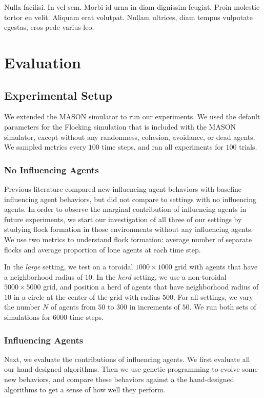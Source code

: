 \begin{savequote}[75mm]
Nulla facilisi. In vel sem. Morbi id urna in diam dignissim feugiat. Proin molestie tortor eu velit. Aliquam erat volutpat. Nullam ultrices, diam tempus vulputate egestas, eros pede varius leo.
\end{savequote}

\chapter{Evaluation}
\label{ch:evaluation}

\section{Experimental Setup}

We extended the MASON simulator to run our experiments\cite{luke05mason}.
We used the default parameters for the Flocking simulation that is included
with the MASON simulator, except without any randomness, cohesion, avoidance,
or dead agents.
We sampled metrics every $100$ time steps, and ran all experiments for $100$
trials.

\subsection{No Influencing Agents}
Previous literature compared new influencing agent behaviors with baseline
influencing agent behaviors, but did not compare to settings with no
influencing agents.
In order to observe the marginal contribution of influencing agents
in future experiments, we start our investigation of all three of our settings
by studying flock formation in those environments without any influencing
agents.
We use two metrics to understand flock formation: average number of separate
flocks and average proportion of lone agents at each time step.

In the \textit{large} setting, we test on a toroidal $1000\times1000$ grid with
agents that have a neighborhood radius of $10$.
In the \textit{herd} setting, we use a non-toroidal $5000\times5000$ grid, and
position a herd of agents that have neighborhood radius of $10$ in a circle at
the center of the grid with radius $500$.
For all settings, we vary the number $N$ of agents from $50$ to $300$ in
increments of $50$.
We run both sets of simulations for $6000$ time steps.

\subsection{Influencing Agents}
Next, we evaluate the contributions of influencing agents.
We first evaluate all our hand-designed algorithms.
Then we use genetic programming to evolve some new behaviors, and compare these
behaviors against a the hand-designed algorithms to get a sense of how well
they perform.

